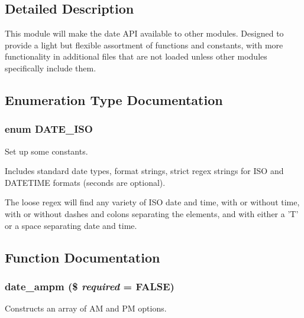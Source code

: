 \subsection{Detailed Description}
This module will make the date API available to other modules. Designed to provide a light but flexible assortment of functions and constants, with more functionality in additional files that are not loaded unless other modules specifically include them. 

\subsection{Enumeration Type Documentation}
\hypertarget{date__api_8module_a88a1cfe07f4c4957d11cf7860a95b21a}{
\subsubsection[{DATE\_\-ISO}]{\setlength{\rightskip}{0pt plus 5cm}enum {\bf DATE\_\-ISO}}}
\label{date__api_8module_a88a1cfe07f4c4957d11cf7860a95b21a}
Set up some constants.

Includes standard date types, format strings, strict regex strings for ISO and DATETIME formats (seconds are optional).

The loose regex will find any variety of ISO date and time, with or without time, with or without dashes and colons separating the elements, and with either a 'T' or a space separating date and time. 

\subsection{Function Documentation}
\hypertarget{date__api_8module_a111c565d163ccc8078a24ef9ed9a642f}{
\subsubsection[{date\_\-ampm}]{\setlength{\rightskip}{0pt plus 5cm}date\_\-ampm (\$ {\em required} = {\ttfamily FALSE})}}
\label{date__api_8module_a111c565d163ccc8078a24ef9ed9a642f}
Constructs an array of AM and PM options.


